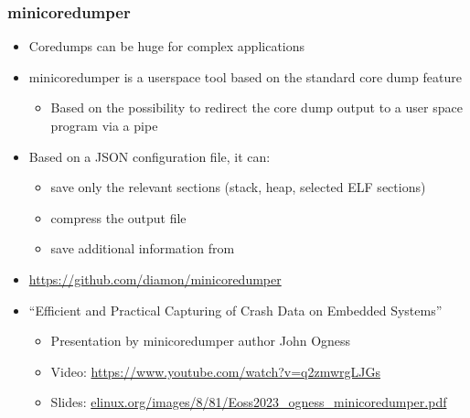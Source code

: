 \begin{frame}
  \frametitle{minicoredumper}
  \begin{itemize}
  \item Coredumps can be huge for complex applications
  \item minicoredumper is a userspace tool based on the standard core dump
    feature
    \begin{itemize}
    \item Based on the possibility to redirect the core dump output to a
      user space program via a pipe
    \end{itemize}
  \item Based on a JSON configuration file, it can:
    \begin{itemize}
    \item save only the relevant sections (stack, heap, selected ELF
      sections)
    \item compress the output file
    \item save additional information from 
    \end{itemize}
  \item \url{https://github.com/diamon/minicoredumper}
  \item ``Efficient and Practical Capturing of Crash Data on Embedded
    Systems''
    \begin{itemize}
      \item Presentation by minicoredumper author John Ogness
      \item Video: \url{https://www.youtube.com/watch?v=q2zmwrgLJGs}
      \item Slides:
        \href{https://elinux.org/images/8/81/Eoss2023_ogness_minicoredumper.pdf}
             {elinux.org/images/8/81/Eoss2023\_ogness\_minicoredumper.pdf}
    \end{itemize}
  \end{itemize}
\end{frame}
